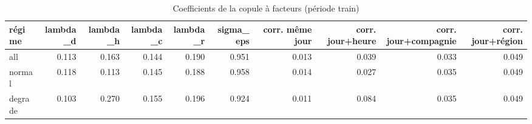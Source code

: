 \begin{table}
\caption{Coefficients de la copule à facteurs (période train)}
\label{tab:params}
\begin{tabular}{lrrrrrrrrr}
\toprule
régime & lambda\_d & lambda\_h & lambda\_c & lambda\_r & sigma\_eps & corr. même jour & corr. jour+heure & corr. jour+compagnie & corr. jour+région \\
\midrule
all & 0.113 & 0.163 & 0.144 & 0.190 & 0.951 & 0.013 & 0.039 & 0.033 & 0.049 \\
normal & 0.118 & 0.113 & 0.145 & 0.188 & 0.958 & 0.014 & 0.027 & 0.035 & 0.049 \\
degrade & 0.103 & 0.270 & 0.155 & 0.196 & 0.924 & 0.011 & 0.084 & 0.035 & 0.049 \\
\bottomrule
\end{tabular}
\end{table}
